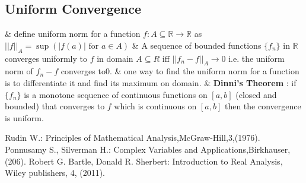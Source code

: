 \documentclass[11pt]{extarticle}
\newcommand{\R}{\mathbb{R}}
\newcommand{\ra}{\rightarrow}
\begin{document}
\begin{multicols}{2}
	\section{Uniform Convergence}
	\begin{easylist}
		& define uniform norm for a function $ f:  A\subseteq \R \ra \R $ as $ ||f||_A=\sup (|f(a)| \text{ for } a \in A) $ 
		& A sequence of bounded functions $ \{f_n\}$ in $\R $ converges uniformly to $ f $ in domain $ A\subseteq R $ iff $ ||f_n-f||_A\ra 0 $ i.e. the uniform norm of $ f_n-f $ converges to$ 0 .$ 
		& one way  to find the uniform norm for a function is to differentiate it and find its maximum on domain.
		& \textbf{Dinni's Theorem }: if $ \{f_n\} $ is a monotone sequence of continuous functions on $ [a,b] $ (closed and bounded) that converges to $ f $ which is continuous on $ [a,b] $ then the convergence is uniform.
		 
	\end{easylist}
	\begin{thebibliography}{9}
		Rudin W.: Principles of Mathematical Analysis,McGraw-Hill,3,(1976).
		Ponnusamy S., Silverman H.: Complex Variables and Applications,Birkhauser,(206).
		Robert G. Bartle, Donald R. Sherbert: Introduction to Real Analysis, Wiley publishers, 4, (2011).
	\end{thebibliography}
\end{multicols}
\end{document}
